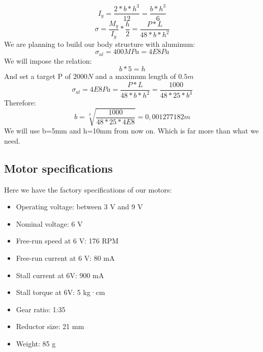 \[I_y = \frac{2*b*h^3}{12}=\frac{b*h^3}{6}\]
\[\sigma=\frac{M_y}{I_y}*\frac{h}{2} = \frac{P*L}{48*b*h^2}\]
We are planning to build our body structure with aluminum:
\[\sigma_{al} = 400MPa = 4E8Pa\]
We will impose the relation:
\[b * 5 = h\]
And set a target P of $2000N$ and a maximum length of $0.5m$
\[\sigma_{al} = 4E8Pa = \frac{P*L}{48*b*h^2} = \frac{1000}{48*25*b^3} \]
Therefore:
\[b = \sqrt[3]{\frac{1000}{48*25*4E8}} = 0,001277182 m\]
We will use b=5mm and h=10mm from now on. Which is far more than what we need.

\subsection{Motor specifications}
Here we have the factory specifications of our motors: 
\begin{itemize}
    \item Operating voltage: between 3 V and 9 V
    \item Nominal voltage: 6 V
    \item Free-run speed at 6 V: 176 RPM
    \item Free-run current at 6 V: 80 mA
    \item Stall current at 6V: 900 mA
    \item Stall torque at 6V: 5 kg·cm
    \item Gear ratio: 1:35
    \item Reductor size: 21 mm
    \item Weight: 85 g
\end{itemize}
